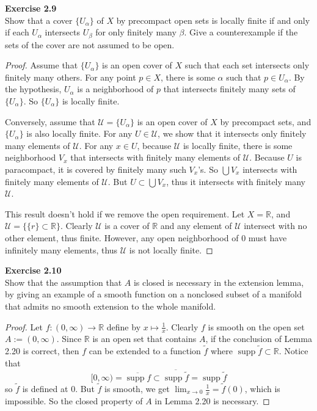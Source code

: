 \documentclass[12pt, a4paper]{article}
\theoremstyle{plain}
\newcommand{\U}{\mathscr{U}}
\newcommand{\R}{\mathbb{R}}
\DeclareMathOperator{\supp}{supp}
\def\tilde{\widetilde}
\newenvironment{exercise}[2][Exercise]
    { \begin{mdframed}[backgroundcolor=gray!20] \textbf{#1 #2} \\}
    {  \end{mdframed}}
\begin{document}
\begin{exercise}{2.9}
    Show that a cover $\{U_\alpha\}$ of $X$ by precompact open sets is locally finite if and only if each $U_\alpha$ intersects $U_\beta$ for only finitely many $\beta$. Give a counterexample if the sets of the cover are not assumed to be open.
\end{exercise}
    \begin{proof}
        Assume that $\{U_\alpha\}$ is an open cover of $X$ such that each set intersects only finitely many others. For any point $p\in X$, there is some $\alpha$ such that $p\in U_\alpha$. By the hypothesis, $U_\alpha$ is a neighborhood of $p$ that intersects finitely many sets of $\{U_\alpha\}$. So $\{U_\alpha\}$ is locally finite.

        Conversely, assume that $\U=\{U_\alpha\}$ is an open cover of $X$ by precompact sets, and $\{U_\alpha\}$ is also locally finite. For any $U\in \U$, we show that it intersects only finitely many elements of $\U$. For any $x\in U$, because $\U$ is locally finite, there is some neighborhood $V_x$ that intersects with finitely many elements of $\U$. Because $U$ is paracompact, it is covered by finitely many such $V_x$'s. So $\bigcup V_x$ intersects with finitely many elements of $\U$. But $U\subset \bigcup V_x$, thus it intersects with finitely many $\U$.  

        This result doesn't hold if we remove the open requirement. Let $X=\R$, and $\U=\{\{r\}\subset \R\}$. Clearly $\U$ is a cover of $\R$ and any element of $\U$ intersect with no other element, thus finite. However, any open neighborhood of $0$ must have infinitely many elements, thus $\U$ is not locally finite.
    \end{proof}


\begin{exercise}{2.10}
    Show that the assumption that $A$ is closed is necessary in the extension lemma, by giving an example of a smooth function on a nonclosed subset of a manifold that admits no smooth extension to the whole manifold.
\end{exercise}
    \begin{proof}
        Let $f\colon (0,\infty)\to \R$ define by $x\mapsto \frac{1}{x}$. Clearly $f$ is smooth on the open set $A:=(0,\infty)$. Since $\R$ is an open set that contains $A$, if the conclusion of Lemma 2.20 is correct, then $f$ can be extended to a function $\tilde f$ where $\supp \tilde f\subset \R$. Notice that
        \[
        [0,\infty) = \overline{\supp f}\subset \overline{\supp\tilde f}=\supp\tilde f
        \]
        so $\tilde f$ is defined at $0$. But $\tilde f$ is smooth, we get $\lim_{x\to 0}\frac{1}{x}=\tilde f(0)$, which is impossible. So the closed property of $A$ in Lemma 2.20 is necessary. 
    \end{proof}
\end{document}
